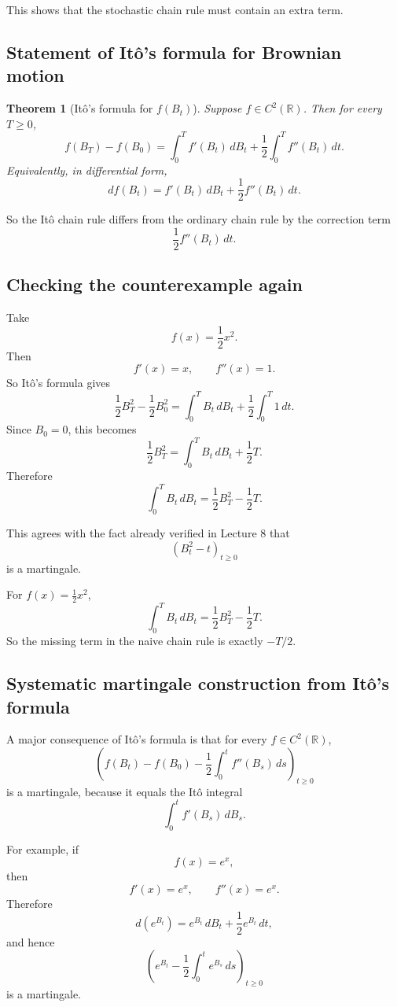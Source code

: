 \documentclass[11pt]{article}
\newtheorem{theorem}{Theorem}[section]
\theoremstyle{definition}
\begin{document}
This shows that the stochastic chain rule must contain an extra term.

\subsection{Statement of It\^o's formula for Brownian motion}

\begin{theorem}[It\^o's formula for \(f(B_t)\)]
Suppose \(f\in C^2(\mathbb R)\). Then for every \(T\ge 0\),
\[
f(B_T)-f(B_0)
=
\int_0^T f'(B_t)\,dB_t
+
\frac12\int_0^T f''(B_t)\,dt.
\]
Equivalently, in differential form,
\[
df(B_t)=f'(B_t)\,dB_t+\frac12 f''(B_t)\,dt.
\]
\end{theorem}

So the It\^o chain rule differs from the ordinary chain rule by the correction term
\[
\frac12 f''(B_t)\,dt.
\]

\subsection{Checking the counterexample again}

Take
\[
f(x)=\frac12 x^2.
\]
Then
\[
f'(x)=x,
\qquad
f''(x)=1.
\]
So It\^o's formula gives
\[
\frac12 B_T^2-\frac12 B_0^2
=
\int_0^T B_t\,dB_t+\frac12\int_0^T 1\,dt.
\]
Since \(B_0=0\), this becomes
\[
\frac12 B_T^2
=
\int_0^T B_t\,dB_t+\frac12 T.
\]
Therefore
\[
\int_0^T B_t\,dB_t
=
\frac12 B_T^2-\frac12 T.
\]

This agrees with the fact already verified in Lecture 8 that
\[
(B_t^2-t)_{t\ge 0}
\]
is a martingale.

\begin{keyformula}
For \(f(x)=\frac12 x^2\),
\[
\int_0^T B_t\,dB_t=\frac12 B_T^2-\frac12 T.
\]
So the missing term in the naive chain rule is exactly \(-T/2\).
\end{keyformula}

\subsection{Systematic martingale construction from It\^o's formula}

A major consequence of It\^o's formula is that for every \(f\in C^2(\mathbb R)\),
\[
\left(
f(B_t)-f(B_0)-\frac12\int_0^t f''(B_s)\,ds
\right)_{t\ge 0}
\]
is a martingale, because it equals the It\^o integral
\[
\int_0^t f'(B_s)\,dB_s.
\]

For example, if
\[
f(x)=e^x,
\]
then
\[
f'(x)=e^x,
\qquad
f''(x)=e^x.
\]
Therefore
\[
d(e^{B_t})=e^{B_t}\,dB_t+\frac12 e^{B_t}\,dt,
\]
and hence
\[
\left(
e^{B_t}-\frac12\int_0^t e^{B_s}\,ds
\right)_{t\ge 0}
\]
is a martingale.
\end{document}
